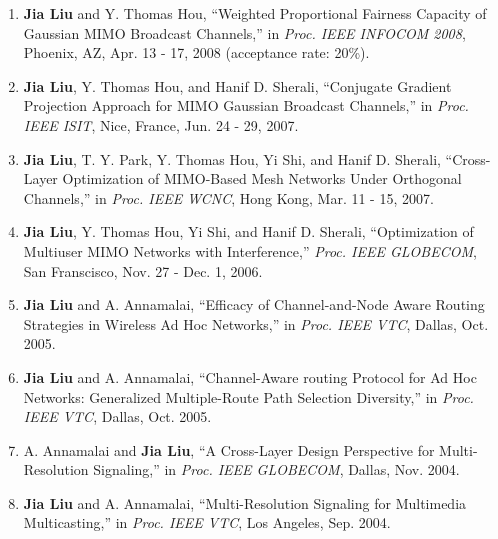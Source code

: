 \documentclass[overlapped,line,letterpaper]{res1}
\begin{document}
\begin{resume}
\begin{enumerate}
\vspace*{.08in} \item \textbf{Jia Liu} and Y. Thomas Hou, ``Weighted Proportional Fairness Capacity of Gaussian MIMO Broadcast Channels,'' in {\em Proc. IEEE INFOCOM 2008}, Phoenix, AZ, Apr. 13 - 17, 2008 (acceptance rate: 20\%).

\vspace*{.08in} \item \textbf{Jia Liu}, Y. Thomas Hou, and Hanif D. Sherali, ``Conjugate Gradient
Projection Approach for MIMO Gaussian Broadcast Channels,'' in {\em Proc. IEEE ISIT}, Nice, France,
Jun. 24 - 29, 2007. %

\vspace*{.08in} \item \textbf{Jia Liu}, T. Y. Park, Y. Thomas Hou, Yi Shi, and Hanif D. Sherali,
``Cross-Layer Optimization of MIMO-Based Mesh Networks Under Orthogonal Channels,'' in {\em Proc.
IEEE WCNC}, Hong Kong, Mar. 11 - 15, 2007. %

\vspace*{.08in} \item \textbf{Jia Liu}, Y. Thomas Hou, Yi Shi, and Hanif D. Sherali, ``Optimization
of Multiuser MIMO Networks with Interference,'' {\em Proc. IEEE GLOBECOM}, San Franscisco, Nov. 27
- Dec. 1, 2006. %

\vspace*{.08in} \item \textbf{Jia Liu} and A. Annamalai, ``Efficacy of Channel-and-Node Aware
Routing Strategies in Wireless Ad Hoc Networks,'' in {\em Proc. IEEE VTC}, Dallas, Oct. 2005. %

\vspace*{.08in} \item \textbf{Jia Liu} and A. Annamalai, ``Channel-Aware routing Protocol for Ad
Hoc Networks: Generalized Multiple-Route Path Selection Diversity,'' in {\em Proc. IEEE VTC},
Dallas, Oct. 2005. %

\vspace*{.08in} \item A. Annamalai and \textbf{Jia Liu}, ``A Cross-Layer Design Perspective for
Multi-Resolution Signaling,'' in {\em Proc. IEEE GLOBECOM}, Dallas, Nov. 2004. %

\vspace*{.08in} \item \textbf{Jia Liu} and A. Annamalai, ``Multi-Resolution Signaling for
Multimedia Multicasting,'' in {\em Proc. IEEE VTC}, Los Angeles, Sep. 2004. %


\end{enumerate}
\end{resume}
\end{document}
